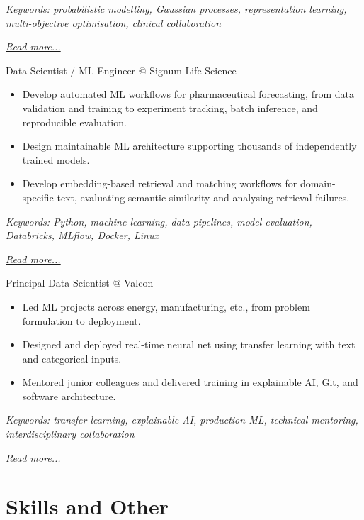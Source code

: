 \documentclass[11pt,a4paper]{moderncv}
\begin{document}
{\footnotesize\textit{Keywords: probabilistic modelling, Gaussian processes, representation learning, multi-objective optimisation, clinical collaboration}}

\hfill{\small{\textit{\hyperref[sec:raysearch]{Read more...}}}}

\large{Data Scientist / ML Engineer @ Signum Life Science}
\normalsize
\begin{itemize}
    \item Develop automated ML workflows for pharmaceutical forecasting, from data validation and training to experiment tracking, batch inference, and reproducible evaluation.
    \item Design maintainable ML architecture supporting thousands of independently trained models.
    \item Develop embedding-based retrieval and matching workflows for domain-specific text, evaluating semantic similarity and analysing retrieval failures.
\end{itemize}

{\footnotesize\textit{Keywords: Python, machine learning, data pipelines, model evaluation, Databricks, MLflow, Docker, Linux}}

\hfill{\small{\textit{\hyperref[sec:signum]{Read more...}}}}

\large{Principal Data Scientist @ Valcon}
\normalsize
\begin{itemize}
    \item Led ML projects across energy, manufacturing, etc., from problem formulation to deployment.
    \item Designed and deployed real-time neural net using transfer learning with text and categorical inputs.
    \item Mentored junior colleagues and delivered training in explainable AI, Git, and software architecture.
\end{itemize}

{\footnotesize\textit{Keywords: transfer learning, explainable AI, production ML, technical mentoring, interdisciplinary collaboration}}

\hfill{\small{\textit{\hyperref[sec:valcon]{Read more...}}}}


\section{Skills and Other}
\end{document}

